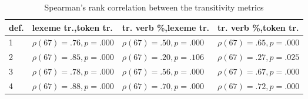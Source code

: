 \begin{table}[ht]{}
    \centering
    \small
    \begin{tabularx}{\textwidth}{lXXX}
      \toprule
      def. & lexeme tr.,\newline token tr. & tr. verb \%,\newline lexeme tr. & tr. verb \%,\newline token tr. \\
      \midrule
      1 & $\rho(67)=.76, p=.000$ & $\rho(67)=.50, p=.000$ & $\rho(67)=.65, p=.000$ \\
      2 & $\rho(67)=.85, p=.000$ & $\rho(67)=.20, p=.106$ & $\rho(67)=.27, p=.025$ \\
      3 & $\rho(67)=.78, p=.000$ & $\rho(67)=.56, p=.000$ & $\rho(67)=.67, p=.000$ \\
      4 & $\rho(67)=.88, p=.000$ & $\rho(67)=.70, p=.000$ & $\rho(67)=.72, p=.000$ \\
      \bottomrule      
    \end{tabularx}
    \caption{Spearman's rank correlation between the transitivity metrics}\label{tab:transitivity_spearmanr} 
\end{table}  